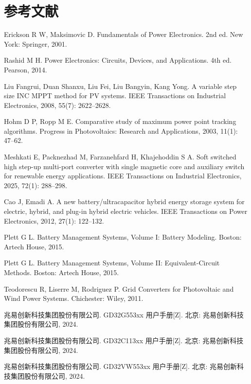 ﻿%
\section*{参考文献}

\begin{enumerate}[label={[\arabic*]}, leftmargin=*, itemsep=0.6ex]
  \item Erickson R W, Maksimovic D. Fundamentals of Power Electronics. 2nd ed. New York: Springer, 2001.
  \item Rashid M H. Power Electronics: Circuits, Devices, and Applications. 4th ed. Pearson, 2014.
  \item Liu Fangrui, Duan Shanxu, Liu Fei, Liu Bangyin, Kang Yong. A variable step size INC MPPT method for PV systems. IEEE Transactions on Industrial Electronics, 2008, 55(7): 2622--2628.
  \item Hohm D P, Ropp M E. Comparative study of maximum power point tracking algorithms. Progress in Photovoltaics: Research and Applications, 2003, 11(1): 47--62.
  \item Meshkati E, Packnezhad M, Farzanehfard H, Khajehoddin S A. Soft switched high step-up multi-port converter with single magnetic core and auxiliary switch for renewable energy applications. IEEE Transactions on Industrial Electronics, 2025, 72(1): 288--298.
  \item Cao J, Emadi A. A new battery/ultracapacitor hybrid energy storage system for electric, hybrid, and plug-in hybrid electric vehicles. IEEE Transactions on Power Electronics, 2012, 27(1): 122--132.
  \item Plett G L. Battery Management Systems, Volume I: Battery Modeling. Boston: Artech House, 2015.
  \item Plett G L. Battery Management Systems, Volume II: Equivalent-Circuit Methods. Boston: Artech House, 2015.
  \item Teodorescu R, Liserre M, Rodriguez P. Grid Converters for Photovoltaic and Wind Power Systems. Chichester: Wiley, 2011.
  \item 兆易创新科技集团股份有限公司. GD32G553xx 用户手册[Z]. 北京: 兆易创新科技集团股份有限公司, 2024.
  \item 兆易创新科技集团股份有限公司. GD32C113xx 用户手册[Z]. 北京: 兆易创新科技集团股份有限公司, 2024.
  \item 兆易创新科技集团股份有限公司. GD32VW553xx 用户手册[Z]. 北京: 兆易创新科技集团股份有限公司, 2024.

\end{enumerate}
